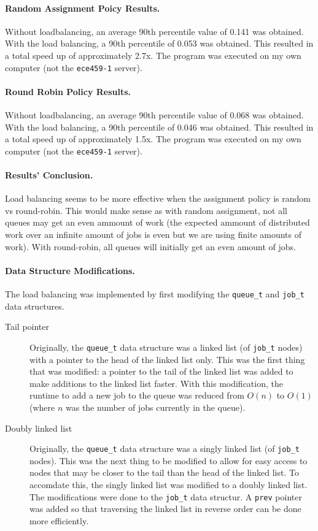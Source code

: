 \documentclass[12pt]{article}
\begin{document}
\paragraph{Random Assignment Poicy Results.} Without loadbalancing, an average 90th percentile value of 0.141 was obtained. With the load balancing, a 90th percentile of 0.053 was obtained. This resulted in a total speed up of approximately 2.7x. The program was executed on my own computer (not the {\tt ece459-1} server).

\paragraph{Round Robin Policy Results.} Without loadbalancing, an average 90th percentile value of 0.068 was obtained. With the load balancing, a 90th percentile of 0.046 was obtained. This resulted in a total speed up of approximately 1.5x. The program was executed on my own computer (not the {\tt ece459-1} server).

\paragraph{Results' Conclusion.} Load balancing seems to be more effective when the assignment policy is random vs round-robin. This would make sense as with random assignment, not all queues may get an even ammount of work (the expected ammount of distributed work over an infinite amount of jobs is even but we are using finite amounts of work). With round-robin, all queues will initially get an even amount of jobs.

\paragraph{Data Structure Modifications.} The load balancing was implemented by first modifying the {\tt queue\_t} and {\tt job\_t} data structures.
\begin{description}
  \item [Tail pointer] Originally, the {\tt queue\_t} data structure was a linked list (of {\tt job\_t} nodes) with a pointer to the head of the linked list only. This was the first thing that was modified: a pointer to the tail of the linked list was added to make additions to the linked list faster. With this modification, the runtime to add a new job to the queue was reduced from \( O(n) \) to \( O(1) \) (where \( n \) was the number of jobs currently in the queue).

  \item [Doubly linked list] Originally, the {\tt queue\_t} data structure was a singly linked list (of {\tt job\_t} nodes). This was the next thing to be modified to allow for easy access to nodes that may be closer to the tail than the head of the linked list. To accomdate this, the singly linked list was modified to a doubly linked list. The modifications were done to the {\tt job\_t} data structur. A {\tt prev} pointer was added so that traversing the linked list in reverse order can be done more efficiently.
\end{description}
\end{document}
